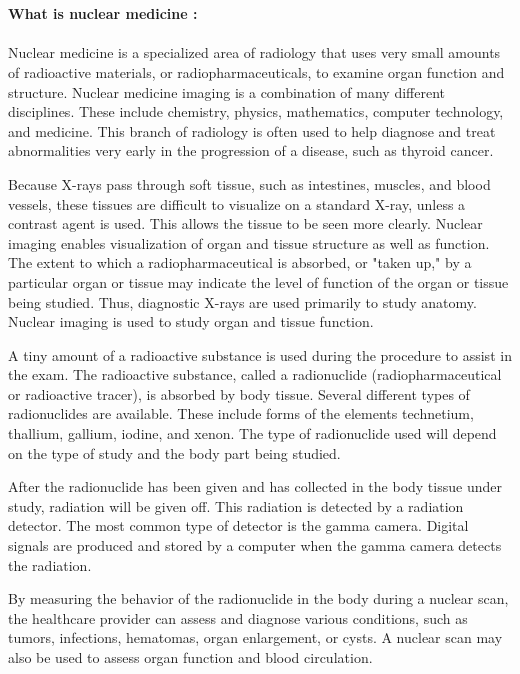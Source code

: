 \documentclass[12pt]{article}
\begin{document}
\\ \\ \noindent
\textbf{\large What is nuclear medicine :} \\ \\ Nuclear medicine is a specialized area of radiology that uses very small amounts of radioactive materials, or radiopharmaceuticals, to examine organ function and structure. Nuclear medicine imaging is a combination of many different disciplines. These include chemistry, physics, mathematics, computer technology, and medicine. This branch of radiology is often used to help diagnose and treat abnormalities very early in the progression of a disease, such as thyroid cancer.

\noindent Because X-rays pass through soft tissue, such as intestines, muscles, and blood vessels, these tissues are difficult to visualize on a standard X-ray, unless a contrast agent is used. This allows the tissue to be seen more clearly. Nuclear imaging enables visualization of organ and tissue structure as well as function. The extent to which a radiopharmaceutical is absorbed, or "taken up," by a particular organ or tissue may indicate the level of function of the organ or tissue being studied. Thus, diagnostic X-rays are used primarily to study anatomy. Nuclear imaging is used to study organ and tissue function.

\noindent A tiny amount of a radioactive substance is used during the procedure to assist in the exam. The radioactive substance, called a radionuclide (radiopharmaceutical or radioactive tracer), is absorbed by body tissue. Several different types of radionuclides are available. These include forms of the elements technetium, thallium, gallium, iodine, and xenon. The type of radionuclide used will depend on the type of study and the body part being studied.

\noindent After the radionuclide has been given and has collected in the body tissue under study, radiation will be given off. This radiation is detected by a radiation detector. The most common type of detector is the gamma camera. Digital signals are produced and stored by a computer when the gamma camera detects the radiation.

\noindent By measuring the behavior of the radionuclide in the body during a nuclear scan, the healthcare provider can assess and diagnose various conditions, such as tumors, infections, hematomas, organ enlargement, or cysts. A nuclear scan may also be used to assess organ function and blood circulation.
\end{document}

